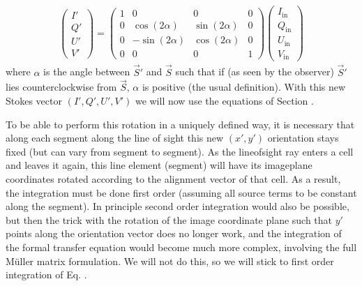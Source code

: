 \documentclass[letterpaper,10pt,english]{sphinxmanual}
\begin{document}
\label{\detokenize{dustradtrans:eq-rot-stokes-align}}\begin{equation*}
\begin{split}\left(\begin{matrix}
I'\\Q'\\U'\\V'
\end{matrix}\right)
=
\left(\begin{matrix}
1 & 0 & 0 & 0 \\
0 & \cos(2\alpha) & \sin(2\alpha) & 0 \\
0 & -\sin(2\alpha) & \cos(2\alpha) & 0 \\
0 & 0 & 0 & 1
\end{matrix}\right)
\left(\begin{matrix}
I_{\mathrm{in}}\\Q_{\mathrm{in}}\\U_{\mathrm{in}}\\V_{\mathrm{in}}
\end{matrix}\right)\end{split}
\end{equation*}
where \(\alpha\) is the angle between \(\vec S'\) and \(\vec S\)
such that if (as seen by the observer) \(\vec S'\) lies counter\sphinxhyphen{}clockwise
from \(\vec S\), \(\alpha\) is positive (the usual definition). With
this new Stokes vector \((I',Q',U',V')\) we will now use the equations of
Section {\hyperref[\detokenize{dustradtrans:sec-basic-equations}]{}}.

To be able to perform this rotation in a uniquely defined way, it is necessary
that along each segment along the line of sight this new \((x',y')\)
orientation stays fixed (but can vary from segment to segment). As the
line\sphinxhyphen{}of\sphinxhyphen{}sight ray enters a cell and leaves it again, this line element (segment)
will have its image\sphinxhyphen{}plane coordinates rotated according to the alignment vector
of that cell. As a result, the integration must be done first order (assuming
all source terms to be constant along the segment).  In principle second order
integration would also be possible, but then the trick with the rotation of the
image coordinate plane such that \(y'\) points along the orientation vector
does no longer work, and the integration of the formal transfer equation would
become much more complex, involving the full Müller matrix formulation. We will
not do this, so we will stick to first order integration of
Eq. .
\end{document}
